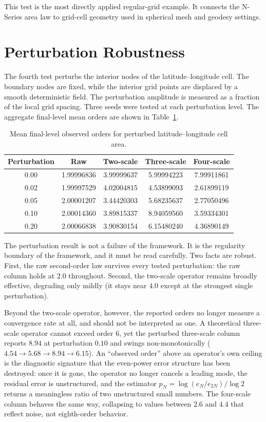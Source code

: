 \documentclass[11pt]{article}
\begin{document}
This test is the most directly applied regular-grid example. It connects the N-Series area
law to grid-cell geometry used in spherical mesh and geodesy settings.

\section{Perturbation Robustness}
The fourth test perturbs the interior nodes of the latitude--longitude cell. The boundary
nodes are fixed, while the interior grid points are displaced by a smooth deterministic
field. The perturbation amplitude is measured as a fraction of the local grid spacing.
Three seeds were tested at each perturbation level. The aggregate final-level mean orders
are shown in Table~\ref{tab:perturb}.

\begin{table}[h]
\centering
\begin{tabular}{ccccc}
\toprule
Perturbation & Raw & Two-scale & Three-scale & Four-scale \\
\midrule
0.00 & 1.99996836 & 3.99999637 & 5.99994223 & 7.99911861 \\
0.02 & 1.99997529 & 4.02004815 & 4.53899093 & 2.61899119 \\
0.05 & 2.00001207 & 3.44420303 & 5.68235637 & 2.77050496 \\
0.10 & 2.00014360 & 3.89815337 & 8.94059560 & 3.59334301 \\
0.20 & 2.00066838 & 3.90830154 & 6.15480240 & 4.36890149 \\
\bottomrule
\end{tabular}
\caption{Mean final-level observed orders for perturbed latitude--longitude cell area.}
\label{tab:perturb}
\end{table}

The perturbation result is not a failure of the framework. It is the regularity boundary of
the framework, and it must be read carefully. Two facts are robust. First, the raw
second-order law survives every tested perturbation: the raw column holds at $2.0$
throughout. Second, the two-scale operator remains broadly effective, degrading only mildly
(it stays near $4.0$ except at the strongest single perturbation).

Beyond the two-scale operator, however, the reported orders no longer measure a convergence
rate at all, and should not be interpreted as one. A theoretical three-scale operator
cannot exceed order $6$, yet the perturbed three-scale column reports $8.94$ at perturbation
$0.10$ and swings non-monotonically ($4.54 \to 5.68 \to 8.94 \to 6.15$). An ``observed
order'' above an operator's own ceiling is the diagnostic signature that the even-power
error structure has been destroyed: once it is gone, the operator no longer cancels a
leading mode, the residual error is unstructured, and the estimator
$p_N=\log(e_N/e_{2N})/\log 2$ returns a meaningless ratio of two unstructured small numbers.
The four-scale column behaves the same way, collapsing to values between $2.6$ and $4.4$
that reflect noise, not eighth-order behavior.
\end{document}
